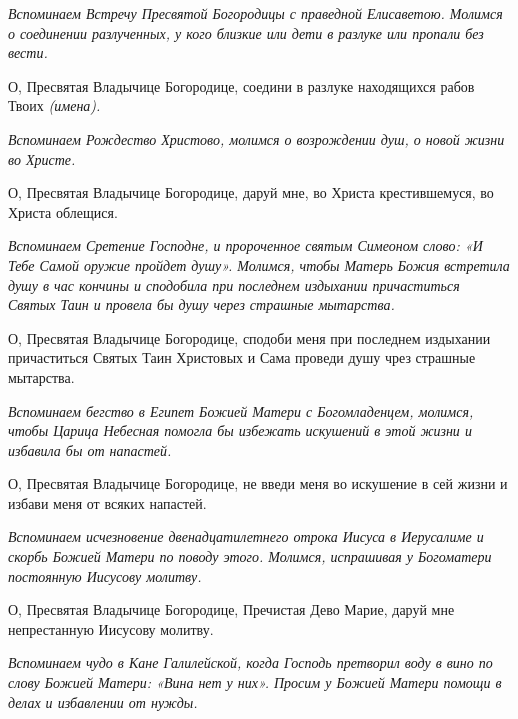 

\itshape Вспоминаем Встречу Пресвятой Богородицы с праведной Елисаветою. Молимся о соединении разлученных, у кого близкие или дети в разлуке или пропали без вести.

\normalfont{}О, Пресвятая Владычице Богородице, соедини в разлуке находящихся рабов Твоих \itshape (имена)\normalfont{}.




\itshape Вспоминаем Рождество Христово, молимся о возрождении душ, о новой жизни во Христе.\normalfont{}

О, Пресвятая Владычице Богородице, даруй мне, во Христа крестившемуся, во Христа облещися.




\itshape Вспоминаем Сретение Господне, и пророченное святым Симеоном слово: «И Тебе Самой оружие пройдет душу». Молимся, чтобы Матерь Божия встретила душу в час кончины и сподобила при последнем издыхании причаститься Святых Таин и провела бы душу через страшные мытарства.

\normalfont{}О, Пресвятая Владычице Богородице, сподоби меня при последнем издыхании причаститься Святых Таин Христовых и Сама проведи душу чрез страшные мытарства.




\itshape Вспоминаем бегство в Египет Божией Матери с Богомладенцем, молимся, чтобы Царица Небесная помогла бы избежать искушений в этой жизни и избавила бы от напастей.

\normalfont{}О, Пресвятая Владычице Богородице, не введи меня во искушение в сей жизни и избави меня от всяких напастей.




\itshape Вспоминаем исчезновение двенадцатилетнего отрока Иисуса в Иерусалиме и скорбь Божией Матери по поводу этого. Молимся, испрашивая у Богоматери постоянную Иисусову молитву.

\normalfont{}О, Пресвятая Владычице Богородице, Пречистая Дево Марие, даруй мне непрестанную Иисусову молитву.




\itshape Вспоминаем чудо в Кане Галилейской, когда Господь претворил воду в вино по слову Божией Матери: «Вина нет у них». Просим у Божией Матери помощи в делах и избавлении от нужды.

